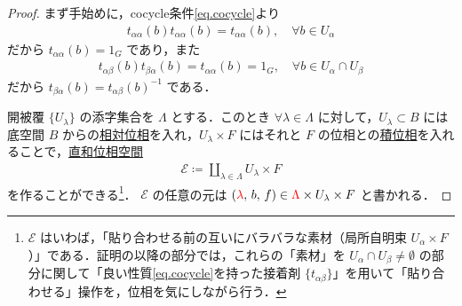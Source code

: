 \documentclass[TQFT_main]{subfiles}
\begin{document}
\begin{proof}
	まず手始めに，cocycle条件\eqref{eq.cocycle}より
	\begin{align}
		t_{\alpha\alpha}(b) t_{\alpha\alpha} (b) = t_{\alpha\alpha}(b),\quad \forall b \in U_\alpha
	\end{align}
	だから $t_{\alpha\alpha}(b) = 1_G$ であり，また
	\begin{align}
		t_{\alpha\beta}(b) t_{\beta\alpha} (b) = t_{\alpha\alpha}(b) = 1_G,\quad \forall b \in U_\alpha \cap U_\beta
	\end{align}
	だから $t_{\beta\alpha}(b) = t_{\alpha\beta}(b)^{-1}$ である．

	開被覆 $\{U_\lambda\}$ の添字集合を $\Lambda$ とする．このとき $\forall \lambda \in \Lambda$ に対して，$U_\lambda \subset B$ には底空間 $B$ からの\hyperref[def.reltopo]{相対位相}を入れ，$U_\lambda \times F$ にはそれと $F$ の位相との\hyperref[def.prodtopo]{積位相}を入れることで，\hyperref[def.disjoint_topo]{直和位相空間}
	\begin{align}
	\mathcal{E} \coloneqq \coprod_{\lambda \in \Lambda} U_\lambda \times F
	\end{align}
	を作ることができる\footnote{$\mathcal{E}$ はいわば，「貼り合わせる前の互いにバラバラな素材（局所自明束 $U_\alpha \times F$）」である．証明の以降の部分では，これらの「素材」を $U_\alpha \cap U_\beta \neq \emptyset$ の部分に関して「良い性質\eqref{eq.cocycle}を持った接着剤 $\{ t_{\alpha\beta} \}$」を用いて「貼り合わせる」操作を，位相を気にしながら行う．}．
	$\mathcal{E}$ の任意の元は $(\textcolor{red}{\lambda},\, b,\, f) \in  \textcolor{red}{\Lambda} \times  U_\lambda \times F$ と書かれる．


\end{proof}
\end{document}
